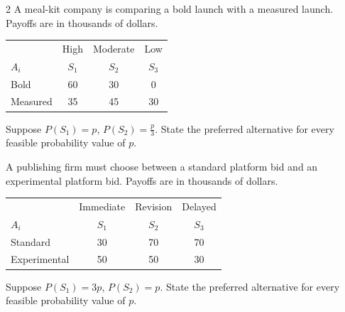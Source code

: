 \begin{multicols}{2}
		A meal-kit company is comparing a bold launch with a measured launch. Payoffs are in thousands of dollars.\vspace{-3mm}
		\begin{center}\setlength{\tabcolsep}{2pt}\renewcommand{\arraystretch}{1.1}
			\begin{tabular}{lccc}\toprule
				&High&Moderate&Low\\ 				
				$A_i$&$S_1$&$S_2$&$S_3$\\ 
				\midrule
				Bold&60&30&0\\
				Measured&35&45&30\\ \bottomrule
			\end{tabular}
		\end{center}\vspace{-3mm}
		Suppose $P(S_1)=p$, $P(S_2)=\frac{p}{3}$. State the preferred alternative for every feasible probability value of $p$.
		
		A publishing firm must choose between a standard platform bid and an experimental platform bid. Payoffs are in thousands of dollars.\vspace{-3mm}
		\begin{center}\setlength{\tabcolsep}{2pt}\renewcommand{\arraystretch}{1.1}
			\begin{tabular}{lccc}\toprule
				&Immediate&Revision&Delayed\\ 
				$A_i$&$S_1$&$S_2$&$S_3$\\ 
				\midrule
				Standard&30&70&70\\
				Experimental&50&50&30\\ \bottomrule
			\end{tabular}
		\end{center}\vspace{-3mm}
		Suppose $P(S_1)=3p$, $P(S_2)=p$. State the preferred alternative for every feasible probability value of $p$.
		
	\end{multicols}


